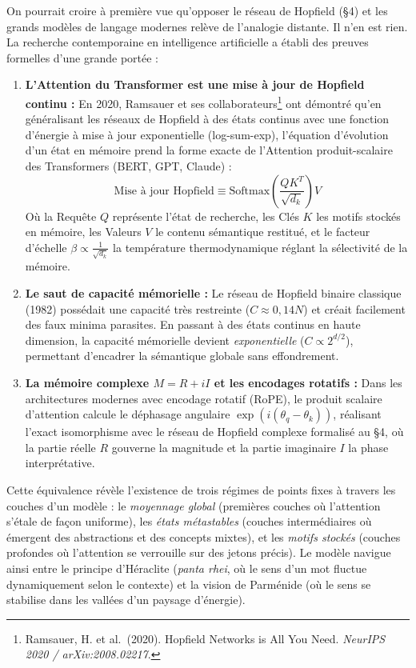 \documentclass[french, 11pt, twoside, openright, a5paper]{book}
\begin{document}
On pourrait croire à première vue qu'opposer le réseau de Hopfield (§4) et les grands modèles de langage modernes relève de l'analogie distante. Il n'en est rien. La recherche contemporaine en intelligence artificielle a établi des preuves formelles d'une grande portée :
\begin{enumerate}
    \item \textbf{L'Attention du Transformer est une mise à jour de Hopfield continu :} En 2020, Ramsauer et ses collaborateurs\footnote{Ramsauer, H. et al.~(2020). Hopfield Networks is All You Need. \emph{NeurIPS 2020 / arXiv:2008.02217}.} ont démontré qu'en généralisant les réseaux de Hopfield à des états continus avec une fonction d'énergie à mise à jour exponentielle (log-sum-exp), l'équation d'évolution d'un état en mémoire prend la forme exacte de l'Attention produit-scalaire des Transformers (BERT, GPT, Claude) :
    \[ \text{Mise à jour Hopfield} \equiv \text{Softmax}\left(\frac{Q K^T}{\sqrt{d_k}}\right) V \]
    Où la Requête $Q$ représente l'état de recherche, les Clés $K$ les motifs stockés en mémoire, les Valeurs $V$ le contenu sémantique restitué, et le facteur d'échelle $\beta \propto \frac{1}{\sqrt{d_k}}$ la température thermodynamique réglant la sélectivité de la mémoire.
    \item \textbf{Le saut de capacité mémorielle :} Le réseau de Hopfield binaire classique (1982) possédait une capacité très restreinte ($C \approx 0{,}14N$) et créait facilement des faux minima parasites. En passant à des états continus en haute dimension, la capacité mémorielle devient \emph{exponentielle} ($C \propto 2^{d/2}$), permettant d'encadrer la sémantique globale sans effondrement.
    \item \textbf{La mémoire complexe $M = R + iI$ et les encodages rotatifs :} Dans les architectures modernes avec encodage rotatif (RoPE), le produit scalaire d'attention calcule le déphasage angulaire $\exp(i(\theta_q - \theta_k))$, réalisant l'exact isomorphisme avec le réseau de Hopfield complexe formalisé au §4, où la partie réelle $R$ gouverne la magnitude et la partie imaginaire $I$ la phase interprétative.
\end{enumerate}

Cette équivalence révèle l'existence de trois régimes de points fixes à travers les couches d'un modèle : le \emph{moyennage global} (premières couches où l'attention s'étale de façon uniforme), les \emph{états métastables} (couches intermédiaires où émergent des abstractions et des concepts mixtes), et les \emph{motifs stockés} (couches profondes où l'attention se verrouille sur des jetons précis). Le modèle navigue ainsi entre le principe d'Héraclite (\emph{panta rhei}, où le sens d'un mot fluctue dynamiquement selon le contexte) et la vision de Parménide (où le sens se stabilise dans les vallées d'un paysage d'énergie).
\end{document}
